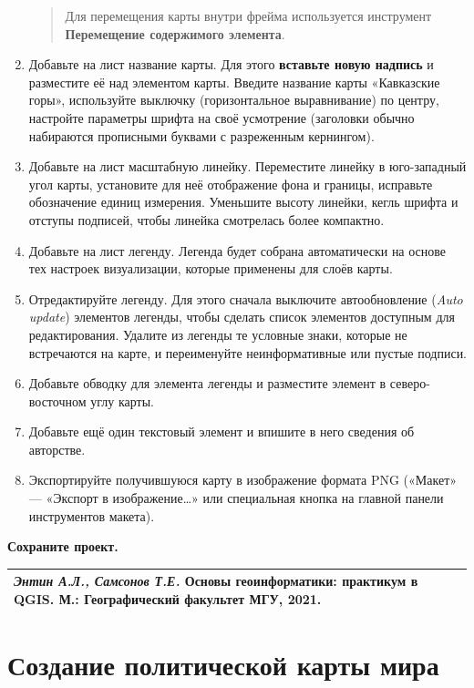 \documentclass[
  12pt,
]{book}
\begin{document}
\begin{enumerate}
  \begin{quote}
  Для перемещения карты внутри фрейма используется инструмент \textbf{Перемещение содержимого элемента}.
  \end{quote}
\item
  Добавьте на лист название карты. Для этого \textbf{вставьте новую надпись} и разместите её над элементом карты. Введите название карты «Кавказские горы», используйте выключку (горизонтальное выравнивание) по центру, настройте параметры шрифта на своё усмотрение (заголовки обычно набираются прописными буквами с разреженным кернингом).
\item
  Добавьте на лист масштабную линейку. Переместите линейку в юго-западный угол карты, установите для неё отображение фона и границы, исправьте обозначение единиц измерения. Уменьшите высоту линейки, кегль шрифта и отступы подписей, чтобы линейка смотрелась более компактно.
\item
  Добавьте на лист легенду. Легенда будет собрана автоматически на основе тех настроек визуализации, которые применены для слоёв карты.
\item
  Отредактируйте легенду. Для этого сначала выключите автообновление (\emph{Auto update}) элементов легенды, чтобы сделать список элементов доступным для редактирования. Удалите из легенды те условные знаки, которые не встречаются на карте, и переименуйте неинформативные или пустые подписи.
\item
  Добавьте обводку для элемента легенды и разместите элемент в северо-восточном углу карты.
\item
  Добавьте ещё один текстовый элемент и впишите в него сведения об авторстве.
\item
  Экспортируйте получившуюся карту в изображение формата PNG («Макет» --- «Экспорт в изображение\ldots» или специальная кнопка на главной панели инструментов макета).
\end{enumerate}

\textbf{Сохраните проект.}

\begin{longtable}[]{@{}l@{}}
\toprule
\endhead
\emph{Энтин А.Л., Самсонов Т.Е.} \textbf{Основы геоинформатики: практикум в QGIS}. М.: Географический факультет МГУ, 2021. \\
\bottomrule
\end{longtable}

\hypertarget{map-design-world}{%
\chapter{Создание политической карты мира}\label{map-design-world}}
\end{document}
